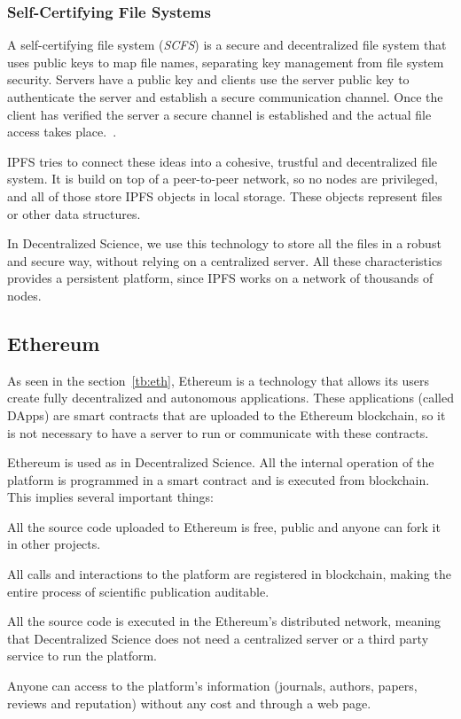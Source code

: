 \subsubsection*{Self-Certifying File Systems}
\label{tech:sec:ipfs:scfs}

 A self-certifying file system (\emph{SCFS}) is a secure and
decentralized file system that uses public keys to map file names, separating
key management from file system security. Servers have a public key and clients
use the server public key to authenticate the server and establish a secure
communication channel. Once the client has verified the server a secure channel
is established and the actual file access takes place.~\cite{mazieres2000self}.

IPFS tries to connect these ideas into a cohesive, trustful and decentralized
file system. It is build on top of a peer-to-peer network, so no nodes are
privileged, and all of those store IPFS objects in local storage. These objects
represent files or other data structures.

In Decentralized Science, we use this technology to store all the files in a
robust and secure way, without relying on a centralized server. All these
characteristics provides a persistent platform, since IPFS works on a network of
thousands of nodes.

\subsection{Ethereum}
\label{tech:sec:ethereum}

As seen in the section~\ref{tb:eth}, Ethereum is a technology that allows its
users create fully decentralized and autonomous applications. These applications
(called DApps) are smart contracts that are uploaded to the Ethereum blockchain,
so it is not necessary to have a server to run or communicate with these
contracts.

Ethereum is used as  in Decentralized Science. All the internal
operation of the platform is programmed in a smart contract and is executed from
blockchain. This implies several important things:

\begin{itemize}
   All the source code uploaded to Ethereum is free, public
  and anyone can fork it in other projects.

   All calls and interactions to the platform are
  registered in blockchain, making the entire process of scientific publication
  auditable.

   All the source code is executed in the Ethereum's
  distributed network, meaning that Decentralized Science does not need a
  centralized server or a third party service to run the platform.

   Anyone can access to the platform's
  information (journals, authors, papers, reviews and reputation) without any
  cost and through a web page.
\end{itemize}

